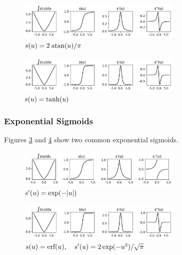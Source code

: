 \documentclass{article}
\begin{document}
    \begin{figure}[h!]
        \centering
        \includegraphics[width=0.7\textwidth]{./figs/nn/sig/atan.png}
        \caption{$s(u)=2\:\text{atan}(u)/\pi$}
        \label{fig:sig_atan}
    \end{figure}

    \begin{figure}[h!]
        \centering
        \includegraphics[width=0.7\textwidth]{./figs/nn/sig/tanh.png}
        \caption{$s(u)=\text{tanh}(u)$}
        \label{fig:sig_tanh}
    \end{figure}

\subsubsection{Exponential Sigmoids}

Figures \ref{fig:sig_exp} and \ref{fig:sig_Gauss} show two common exponential sigmoids.


    \begin{figure}[h!]
        \centering
        \includegraphics[width=0.7\textwidth]{./figs/nn/sig/exp.png}
        \caption{$s'(u)=\exp(-|u|)$}
        \label{fig:sig_exp}
    \end{figure} 

    \begin{figure}[h!]
        \centering
        \includegraphics[width=0.7\textwidth]{./figs/nn/sig/Gauss.png}
        \caption{$s(u)=\text{erf}(u),\quad s'(u)=2\exp(-u^2)/\sqrt{\pi}$}
        \label{fig:sig_Gauss}
    \end{figure}
\end{document}
